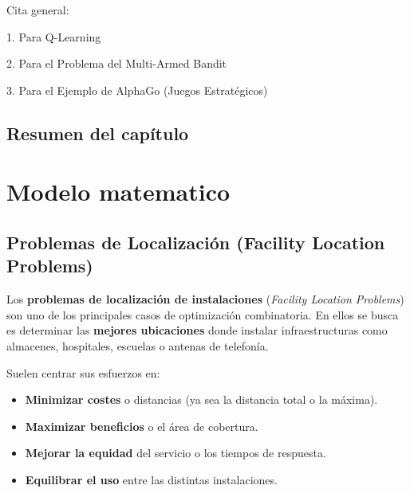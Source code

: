 \documentclass[12pt,a4paper]{book}
\begin{document}
Cita general:


1. Para Q-Learning


2. Para el Problema del Multi-Armed Bandit


3. Para el Ejemplo de AlphaGo (Juegos Estratégicos)


\color{black}

\section{Resumen del capítulo}

\chapter{Modelo matematico}

\section{Problemas de Localización (Facility Location Problems)}

Los \textbf{problemas de localización de instalaciones} (\textit{Facility Location Problems}) son uno de los principales casos de optimización combinatoria. En ellos se busca es determinar las \textbf{mejores ubicaciones} donde instalar infraestructuras como almacenes, hospitales, escuelas o antenas de telefonía.

Suelen centrar sus esfuerzos en:
\begin{itemize}
    \item \textbf{Minimizar costes} o distancias (ya sea la distancia total o la máxima).
    \item \textbf{Maximizar beneficios} o el área de cobertura.
    \item \textbf{Mejorar la equidad} del servicio o los tiempos de respuesta.
    \item \textbf{Equilibrar el uso} entre las distintas instalaciones.
\end{itemize}
\end{document}
